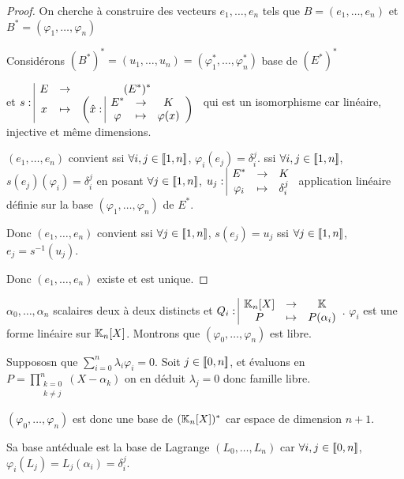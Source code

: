\begin{proof}
    On cherche à construire des vecteurs $e_1, \dots, e_n$ tels que 
    $B = (e_1, \dots, e_n)$ et $B^* = (\varphi_1, \dots, \varphi_n)$

    Considérons $(B^*)^* = (u_1, \dots, u_n) = (\varphi_1^*, \dots, \varphi_n^*)$ base de $(E^*)^*$

    et $s: \space \begin{array}{|ccc} \displaystyle E & \to & \displaystyle (E^*)^* \\ \displaystyle x & \mapsto & \displaystyle \left( \hat x: \space \begin{array}{|ccc} \displaystyle E^* & \to & \displaystyle K \\ \displaystyle \varphi & \mapsto & \displaystyle \varphi(x) \end{array} \right) \end{array}$ qui est un isomorphisme 
    car linéaire, injective et même dimensions. 

    $(e_1, \dots, e_n)$ convient ssi $\forall i, j \in [\![1, n]\!]$, $\varphi_i(e_j) = \delta_i^j$.
    ssi $\forall i, j \in [\![1, n]\!]$, $s(e_j)(\varphi_i) = \delta_i^j$ 
    en posant $\forall j \in [\![1, n]\!]$, $u_j: \space \begin{array}{|ccc} \displaystyle E^* & \to & \displaystyle K \\ \displaystyle \varphi_i & \mapsto & \displaystyle \delta_i^j \end{array}$ 
    application linéaire définie sur la base $(\varphi_1, \dots, \varphi_n)$ de $E^*$.

    Donc $(e_1, \dots, e_n)$ convient ssi $\forall j \in [\![1, n]\!]$, $s(e_j) = u_j$
    ssi $\forall j \in [\![1, n]\!]$, $e_j = s^{-1}(u_j)$.

    Donc $(e_1, \dots, e_n)$ existe et est unique.
\end{proof}

\begin{exemple}
    $\alpha_0, \dots, \alpha_n$ scalaires deux à deux distincts et $Q_i: \space \begin{array}{|ccc} \displaystyle \mathbb{K}_n[X] & \to & \displaystyle \mathbb{K} \\ \displaystyle P & \mapsto & \displaystyle P(\alpha_i) \end{array}$.
    $\varphi_i$ est une forme linéaire sur $\mathbb{K}_n[X]$. Montrons que $(\varphi_0, \dots, \varphi_n)$ est libre. 

    Suppososn que $\sum_{i=0}^n \lambda_i \varphi_i = 0$. 
    Soit $j \in [\![0, n]\!]$, et évaluons en $P = \prod_{\substack{k=0 \\ k \neq j}}^n (X - \alpha_k)$ on en 
    déduit $\lambda_j = 0$ donc famille libre.

    $(\varphi_0, \dots, \varphi_n)$ est donc une base de $(\mathbb{K}_n[X])^*$ car espace de dimension $n + 1$.

    Sa base antéduale est la base de Lagrange $(L_0, \dots, L_n)$ car $\forall i, j \in [\![0, n]\!]$, $\varphi_i(L_j) = L_j(\alpha_i) = \delta_i^j$.
\end{exemple}

